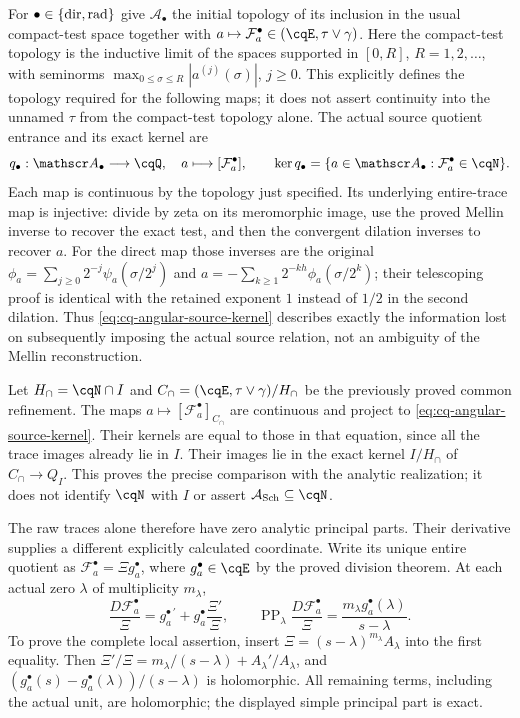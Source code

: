 For $\bullet\in\{{\rm dir},{\rm rad}\}$ give
$\mathscr A_\bullet$ the initial topology of its inclusion in
the usual compact-test space together with
$a\mapsto\mathcal F_a^\bullet\in(\cqE,\tau\vee\gamma)$.
Here the compact-test topology is the inductive limit of the spaces
supported in $[0,R]$, $R=1,2,\ldots$, with seminorms
$\max_{0\leq\sigma\leq R}|a^{(j)}(\sigma)|$, $j\geq0$.
This explicitly defines the topology required for the following
maps; it does not assert continuity into the unnamed $\tau$
from the compact-test topology alone.
The actual source quotient entrance and its exact kernel are
\begin{equation}
 q_\bullet:\mathscr A_\bullet\longrightarrow\cqQ,\quad
 a\longmapsto[\mathcal F_a^\bullet],\qquad
 \ker q_\bullet
  =\{a\in\mathscr A_\bullet:\mathcal F_a^\bullet\in\cqN\}.
 \label{eq:cq-angular-source-kernel}
\end{equation}
Each map is continuous by the topology just specified.
Its underlying entire-trace map is injective: divide by zeta on
its meromorphic image, use the proved Mellin inverse to recover
the exact test, and then the convergent dilation inverses to
recover $a$. For the direct map those inverses are the original
$\phi_a=\sum_{j\geq0}2^{-j}\psi_a(\sigma/2^j)$ and
$a=-\sum_{k\geq1}2^{-kh}\phi_a(\sigma/2^k)$;
their telescoping proof is identical with the retained exponent
$1$ instead of $1/2$ in the second dilation.
Thus \eqref{eq:cq-angular-source-kernel} describes exactly the
information lost on subsequently imposing the actual source
relation, not an ambiguity of the Mellin reconstruction.

Let $H_\cap=\cqN\cap I$ and
$C_\cap=(\cqE,\tau\vee\gamma)/H_\cap$ be the previously proved
common refinement. The maps
$a\mapsto[\mathcal F_a^\bullet]_{C_\cap}$ are continuous and
project to \eqref{eq:cq-angular-source-kernel}. Their kernels
are equal to those in that equation, since all the trace images
already lie in $I$. Their images lie in the exact kernel
$I/H_\cap$ of $C_\cap\to Q_I$. This proves the precise
comparison with the analytic realization; it does not identify
$\cqN$ with $I$ or assert $\mathcal A_{\rm Sch}\subseteq\cqN$.

The raw traces alone therefore have zero analytic principal
parts. Their derivative supplies a different explicitly
calculated coordinate. Write its unique entire quotient as
$\mathcal F_a^\bullet=\Xi g_a^\bullet$, where
$g_a^\bullet\in\cqE$ by the proved division theorem.
At each actual zero $\lambda$ of multiplicity $m_\lambda$,
\begin{equation}
 \frac{D\mathcal F_a^\bullet}{\Xi}
  =g_a^{\bullet\,\prime}
        +g_a^\bullet\frac{\Xi'}{\Xi},\qquad
 \operatorname{PP}_{\lambda}
       \frac{D\mathcal F_a^\bullet}{\Xi}
  =\frac{m_\lambda g_a^\bullet(\lambda)}{s-\lambda}.
 \label{eq:cq-angular-derivative-principal-part}
\end{equation}
To prove the complete local assertion, insert
$\Xi=(s-\lambda)^{m_\lambda}A_\lambda$ into the first equality.
Then $\Xi'/\Xi=m_\lambda/(s-\lambda)+A_\lambda'/A_\lambda$,
and
$(g_a^\bullet(s)-g_a^\bullet(\lambda))/(s-\lambda)$
is holomorphic. All remaining terms, including the actual unit,
are holomorphic; the displayed simple principal part is exact.

